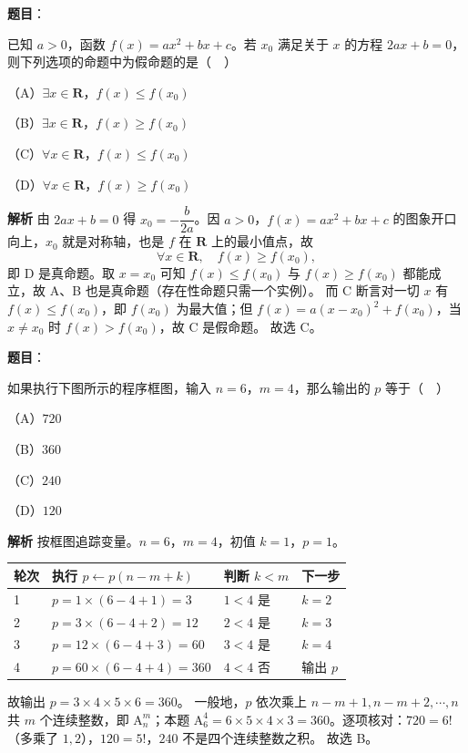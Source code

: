 \begin{answer}

\textbf{题目}：

已知 $a>0$，函数 $f(x)=ax^2+bx+c$。若 $x_0$ 满足关于 $x$ 的方程 $2ax+b=0$，则下列选项的命题中为假命题的是（　）

（A）$\exists x\in\mathbf R$，$f(x)\leqslant f(x_0)$

（B）$\exists x\in\mathbf R$，$f(x)\geqslant f(x_0)$

（C）$\forall x\in\mathbf R$，$f(x)\leqslant f(x_0)$

（D）$\forall x\in\mathbf R$，$f(x)\geqslant f(x_0)$

\textbf{解析}
由 $2ax+b=0$ 得 $x_0=-\dfrac{b}{2a}$。因 $a>0$，$f(x)=ax^2+bx+c$ 的图象开口向上，$x_0$ 就是对称轴，也是 $f$ 在 $\mathbf R$ 上的最小值点，故
\nopagebreak[4]
\[\forall x\in\mathbf R,\quad f(x)\geqslant f(x_0),\]
即 D 是真命题。取 $x=x_0$ 可知 $f(x)\leqslant f(x_0)$ 与 $f(x)\geqslant f(x_0)$ 都能成立，故 A、B 也是真命题（存在性命题只需一个实例）。
而 C 断言对一切 $x$ 有 $f(x)\leqslant f(x_0)$，即 $f(x_0)$ 为最大值；但 $f(x)=a\left(x-x_0\right)^2+f(x_0)$，当 $x\neq x_0$ 时 $f(x)>f(x_0)$，故 C 是假命题。
故选 C。


\end{answer}
\begin{answer}

\textbf{题目}：

如果执行下图所示的程序框图，输入 $n=6$，$m=4$，那么输出的 $p$ 等于（　）

（A）$720$

（B）$360$

（C）$240$

（D）$120$
\nopagebreak[4]
\begin{center}\end{center}
\nopagebreak[4]
\textbf{解析}
按框图追踪变量。$n=6$，$m=4$，初值 $k=1$，$p=1$。

\begin{center}
\begin{tabular}{llll}
\toprule
轮次 & 执行 $p\leftarrow p(n-m+k)$ & 判断 $k<m$ & 下一步 \\
\midrule
1 & $p=1\times(6-4+1)=3$ & $1<4$ 是 & $k=2$ \\
2 & $p=3\times(6-4+2)=12$ & $2<4$ 是 & $k=3$ \\
3 & $p=12\times(6-4+3)=60$ & $3<4$ 是 & $k=4$ \\
4 & $p=60\times(6-4+4)=360$ & $4<4$ 否 & 输出 $p$ \\
\bottomrule
\end{tabular}
\end{center}

故输出 $p=3\times4\times5\times6=360$。
一般地，$p$ 依次乘上 $n-m+1,n-m+2,\cdots,n$ 共 $m$ 个连续整数，即 $\mathrm A_n^m$；本题 $\mathrm A_6^4=6\times5\times4\times3=360$。逐项核对：$720=6!$（多乘了 $1,2$），$120=5!$，$240$ 不是四个连续整数之积。
故选 B。


\end{answer}
